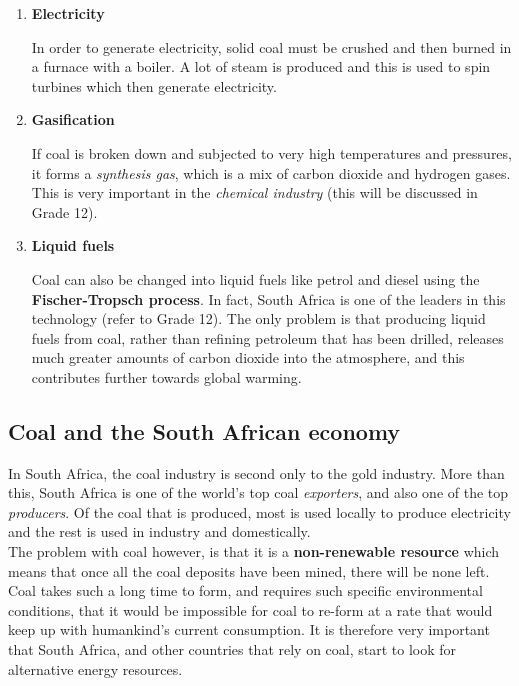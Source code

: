\begin{enumerate}
\item{\textbf{Electricity}

In order to generate electricity, solid coal must be crushed and then burned in a furnace with a boiler. A lot of steam is produced and this is used to spin turbines which then generate electricity.
}

\item{\textbf{Gasification}

If coal is broken down and subjected to very high temperatures and pressures, it forms a \textit{synthesis gas}, which is a mix of carbon dioxide and hydrogen gases. This is very important in the \textit{chemical industry} (this will be discussed in Grade 12).
}

\item{\textbf{Liquid fuels}

Coal can also be changed into liquid fuels like petrol and diesel using the \textbf{Fischer-Tropsch process}. In fact, South Africa is one of the leaders in this technology (refer to Grade 12). The only problem is that producing liquid fuels from coal, rather than refining petroleum that has been drilled, releases much greater amounts of carbon dioxide into the atmosphere, and this contributes further towards global warming.
}
\end{enumerate}

\subsection{Coal and the South African economy}

In South Africa, the coal industry is second only to the gold industry. More than this, South Africa is one of the world's top coal \textit{exporters}, and also one of the top \textit{producers}. Of the coal that is produced, most is used locally to produce electricity and the rest is used in industry and domestically.\\

The problem with coal however, is that it is a \textbf{non-renewable resource} which means that once all the coal deposits have been mined, there will be none left. Coal takes such a long time to form, and requires such specific environmental conditions, that it would be impossible for coal to re-form at a rate that would keep up with humankind's current consumption. It is therefore very important that South Africa, and other countries that rely on coal, start to look for alternative energy resources.


